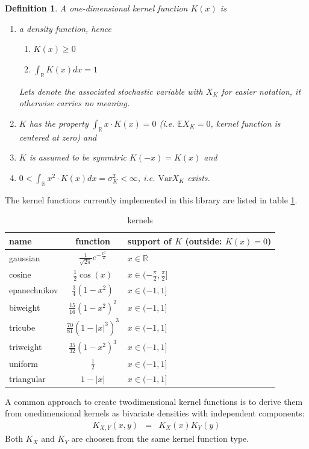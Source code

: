 \documentclass[nojss]{jss}
\newcommand{\R}{\mathbb{R}}
\newcommand{\EV}{\mathbb{E}}
\newcommand{\Var}{\mbox{Var}}
\newtheorem{definition}{Definition}[section]
\begin{document}
\begin{definition}
A one-dimensional kernel function $K(x)$ is
\begin{enumerate}
\item a density function, hence
  \begin{enumerate}
  \item $K(x)\ge 0$
  \item $\int_{\R}K(x)dx=1$
  \end{enumerate}
  Lets denote the associated stochastic variable with $X_{K}$ for
  easier notation, it otherwise carries no meaning.
\item $K$ has the property $\int_{\R}x\cdot K(x)=0$ (i.e. $\EV X_{K}=0$,
  kernel function is centered at zero) and
  
\item $K$ is assumed to be symmtric $K(-x)=K(x)$ and
\item $0<\int_{\R}x^{2}\cdot K(x)dx=\sigma^{2}_{K}<\infty$, i.e.
  $\Var X_{K}$ exists.
  \end{enumerate}
\end{definition}
The kernel functions currently implemented in this library are listed
in table \ref{tab:kernels}.
\begin{table}[htbp]
  \centering
  \begin{tabular}{l|c|l}
    name & function & support of $K$ (outside: $K(x)=0$)\\
    \hline
    gaussian      & $\frac{1}{\sqrt{2\pi}}e^{-\frac{x^{2}}{2}}$ & $x\in\R$\\
    cosine       & $\frac{1}{2}\cos(x)$ &$x\in(-\frac{\pi}{2},\frac{\pi}{2}]$\\
    epanechnikov & $\frac{3}{4}(1-x^{2})$&$x\in(-1,1]$\\
    biweight     & $\frac{15}{16}(1-x^{2})^{2}$&$x\in(-1,1]$\\
    tricube      & $\frac{70}{81}(1-|x|^{3})^{3}$ &$x\in(-1,1]$\\
    triweight    & $\frac{35}{32}(1-x^{2})^{3}$  &$x\in(-1,1]$\\
    uniform      & $\frac{1}{2}$ & $x\in(-1,1]$\\
    triangular   & $1-|x|$  &$x\in(-1,1]$
  \end{tabular}
  \caption{kernels}
  \label{tab:kernels}
\end{table}

A common approach to create twodimensional kernel functions is to
derive them from onedimensional kernels as bivariate densities with
independent components:
\begin{eqnarray*}
  K_{X,Y}(x,y)&=&K_{X}(x)K_{Y}(y)
\end{eqnarray*}
Both $K_X$ and $K_Y$ are choosen from the same kernel function type.
\end{document}
